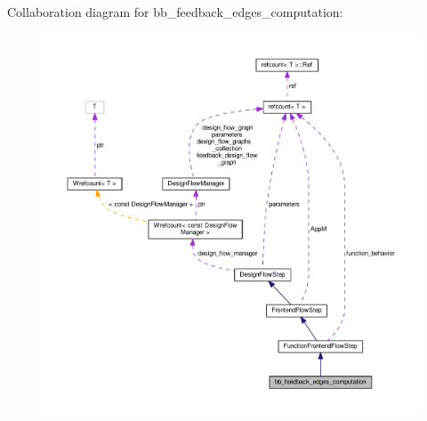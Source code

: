 Collaboration diagram for bb\+\_\+feedback\+\_\+edges\+\_\+computation\+:
\nopagebreak
\begin{figure}[H]
\begin{center}
\leavevmode
\includegraphics[width=350pt]{d0/d7b/classbb__feedback__edges__computation__coll__graph}
\end{center}
\end{figure}
